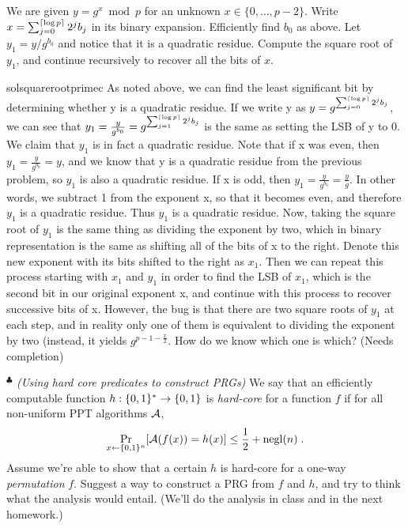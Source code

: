 \begin{questions}
\begin{parts}
		We are given $y=g^x \bmod p$ for an unknown $x \in \{0,\ldots,p-2\}$. Write $x = \sum_{j=0}^{\lceil{\log p}\rceil} 2^j b_j$
		in its binary expansion. Efficiently find $b_0$ as above. 
		Let $y_1 = y / g^{b_0}$ and notice that it is a quadratic residue. Compute the square root of $y_1$, and continue
		recursively to recover all the bits of $x$.
    \begin{mysolution}{solsquarerootprimec}
      As noted above, we can find the least significant bit by determining whether y is a quadratic residue.  If we write y as $y =g^{\sum_{j=0}^{\lceil{\log p}\rceil} 2^j b_j} $, we can see that $y_1 = \frac{y}{g^{b_0}} = g^{\sum_{j=1}^{\lceil{\log p}\rceil} 2^j b_j} $ is the same as setting the LSB of y to 0. We claim that $y_1$ is in fact a quadratic residue. Note that if x was even, then $y_1 = \frac{y}{g^{b_0}}=y$, and we know that y is a quadratic residue from the previous problem, so $y_1$ is also a quadratic residue. If x is odd, then $y_1 = \frac{y}{g^{b_0}} = \frac{y}{g}$. In other words, we subtract 1 from the exponent x, so that it becomes even, and therefore $y_1$ is a quadratic residue. Thus $y_1$ is a quadratic residue. Now, taking the square root of $y_1$ is the same thing as dividing the exponent by two, which in binary representation is the same as shifting all of the bits of x to the right. Denote this new exponent with its bits shifted to the right as $x_1$. Then we can repeat this process starting with $x_1$ and $y_1$ in order to find the LSB of $x_1$, which is the second bit in our original exponent x, and continue with this process to recover successive bits of x. However, the bug is that there are two square roots of $y_1$ at each step, and in reality only one of them is equivalent to dividing the exponent by two (instead, it yields $g^{p-1-\frac{x}{2}}$. How do we know which one is which? (Needs completion)
  \end{mysolution}

  \end{parts}
	




  \question[2]$^\clubsuit$ \emph{(Using hard core predicates to construct PRGs)}
    We say that an efficiently computable function $h:\{{0,1}\}^* \to \{{0,1}\}$ is \emph{hard-core} for a function $f$ if for all non-uniform PPT 
		algorithms $\mathcal{A}$, 
		\[
		   \Pr_{x \leftarrow \{{0,1}\}^n}[\mathcal{A}(f(x))=h(x)] \le \frac{1}{2}+\operatorname{negl}(n)\;.
		\]
		Assume we're able to show that a certain $h$ is hard-core for a one-way \emph{permutation} $f$. 
		Suggest a way to construct a PRG from $f$ and $h$, and try to think what the 
		analysis would entail. (We'll do the analysis in class and in the next homework.)
		    

\end{questions}
